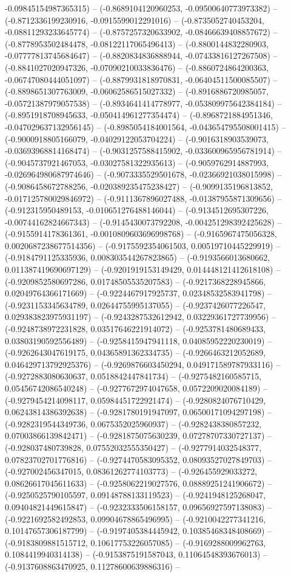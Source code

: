 -0.09845154987365315) -- (-0.8689104120960253, -0.09500640773973382) -- (-0.8712336199230916, -0.0915599012291016) -- (-0.8735052740453204, -0.08811293233645774) -- (-0.8757257320633902, -0.08466639408857672) -- (-0.8778953502484478, -0.08122117065496413) -- (-0.8800144832280903, -0.07777813745684647) -- (-0.8820834836888944, -0.07433816127267508) -- (-0.8841027020947326, -0.07090210033836476) -- (-0.8860724864200363, -0.06747080444051097) -- (-0.8879931818970831, -0.06404511500085507) -- (-0.8898651307763009, -0.06062586515027332) -- (-0.8916886720985057, -0.05721387979057538) -- (-0.8934641414778977, -0.053809975642384184) -- (-0.8951918708945633, -0.050414961277354474) -- (-0.8968721884951346, -0.047029637132956145) -- (-0.8985054184001564, -0.043654795508001415) -- (-0.9000918805166079, -0.04029122053704224) -- (-0.9016318903539073, -0.03693968814168474) -- (-0.9031257588415902, -0.033600965956781914) -- (-0.9045737921467053, -0.03027581322935613) -- (-0.9059762914887993, -0.026964980687974646) -- (-0.9073335529501678, -0.02366921038015998) -- (-0.9086458672788256, -0.020389235475238427) -- (-0.9099135196813852, -0.017125780029846972) -- (-0.9111367896027488, -0.01387955871309656) -- (-0.912315950489153, -0.010651276488146044) -- (-0.9134512695307226, -0.00744162824667343) -- (-0.9145430073792208, -0.004251298392425628) -- (-0.9155914178361361, -0.0010809603696998768) -- (-0.9165967475056328, 0.0020687238677514356) -- (-0.9175592354061503, 0.00519710445229919) -- (-0.9184791125335936, 0.008303544267823865) -- (-0.9193566013680662, 0.011387419690697129) -- (-0.9201919153149429, 0.014448121412618108) -- (-0.9209852580697286, 0.01748505535207583) -- (-0.9217368228945866, 0.02049764366171669) -- (-0.9224467917925737, 0.02348532583941798) -- (-0.9231153345634789, 0.02644755995137055) -- (-0.9237426077226547, 0.029383823975931197) -- (-0.9243287532612942, 0.03229361727739956) -- (-0.9248738972231828, 0.03517646221914072) -- (-0.9253781480689433, 0.03803190592556489) -- (-0.9258415947941118, 0.04085952220230019) -- (-0.9262643047619175, 0.04365891362334735) -- (-0.9266463212052689, 0.046429713792925376) -- (-0.9269876603450294, 0.049171589787933116) -- (-0.9272883080630637, 0.0518842447841734) -- (-0.9275482160585715, 0.05456742086540248) -- (-0.9277672974047658, 0.0572209020084189) -- (-0.9279454214098117, 0.05984451722921474) -- (-0.9280824076710429, 0.06243814386392638) -- (-0.9281780191947097, 0.06500171094297198) -- (-0.9282319544349736, 0.0675352025960937) -- (-0.9282438380857232, 0.07003866139842471) -- (-0.9281875075630239, 0.07278707330727137) -- (-0.928037480739828, 0.07552032555350427) -- (-0.9277914032548377, 0.07823702701776816) -- (-0.9274470583095352, 0.08093527027849703) -- (-0.927002456347015, 0.08361262774103773) -- (-0.926455929033272, 0.08626617045611633) -- (-0.9258062219027576, 0.08889251241906672) -- (-0.9250525790105597, 0.09148788133119523) -- (-0.9241948125268047, 0.09404821449615847) -- (-0.9232333506158157, 0.09656927597138083) -- (-0.9221692582492853, 0.09904678865496995) -- (-0.9210042277341216, 0.10147657306187799) -- (-0.9197405384445942, 0.10385468348408669) -- (-0.9183809881515712, 0.10617753226057085) -- (-0.9169288009962763, 0.1084419940314138) -- (-0.9153875191587043, 0.11064548393676013) -- (-0.9137608863470925, 0.11278600639886316) -- 